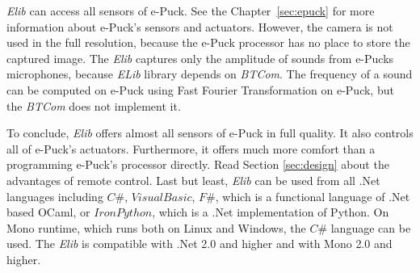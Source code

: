   {\it Elib} can access all sensors of e-Puck. See the Chapter~\ref{sec:epuck} 
  for more information about e-Puck's sensors and actuators.
  However, the camera is not used in the full resolution,
  because the e-Puck processor has no place to store the captured image.
  The {\it Elib} captures only the amplitude of sounds from e-Pucks microphones,
  because {\it ELib} library depends on {\it BTCom}.
  The frequency of a sound can be computed on e-Puck
  using Fast Fourier Transformation on e-Puck, 
  but the {\it BTCom} does not implement it.

  To conclude, {\it Elib} offers almost all sensors of e-Puck in full quality. 
  It also controls all of e-Puck's actuators.
  Furthermore, it offers much more comfort than a programming e-Puck's processor directly. 
  Read Section \ref{sec:design} about the advantages
  of remote control. 
  Last but least, {\it Elib} can be used from all .Net languages 
  including $C\#$, $Visual Basic$, $F\#$,
  which is a functional language of .Net based OCaml,
  or $Iron Python$, which is a .Net implementation of Python. On Mono runtime, 
  which runs both on Linux and Windows, the $C\#$ language can be used.
  The {\it Elib} is compatible with .Net 2.0 \cite{net} and higher 
  and with Mono \cite{mono} 2.0 and higher.

